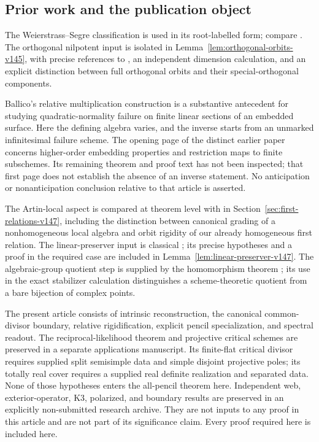 \documentclass[11pt,reqno]{amsart}
\numberwithin{equation}{section}
\theoremstyle{definition}\newtheorem{definition}[theorem]{Definition}
\theoremstyle{remark}\newtheorem{remark}[theorem]{Remark}
\begin{document}
\subsection{Prior work and the publication object}
The Weierstrass--Segre classification is used in its root-labelled
form; compare \cite[Theorem~1.1 and Corollary~2.1]{FevolaMandelshtamSturmfels}.
The orthogonal nilpotent input is isolated in
Lemma~\ref{lem:orthogonal-orbits-v145}, with precise references to
\cite[Proposition~1 and Theorem~1]{Ohta1986}, an independent dimension
calculation, and an explicit distinction between full orthogonal
orbits and their special-orthogonal components.

Ballico's relative multiplication construction
\cite[Theorem~0.2; \S1, Remark~1.2 and equation~(6)]{Ballico96}
is a substantive antecedent for studying quadratic-normality failure
on finite linear sections of an embedded surface.  Here the defining
algebra varies, and the inverse starts from an unmarked infinitesimal
failure scheme.  The opening page of the distinct earlier paper \cite[p.~5]{Ballico93}
concerns higher-order embedding properties and restriction maps to
finite subschemes.  Its remaining theorem and proof text has not
been inspected; that first page does not establish the absence of
an inverse statement.  No anticipation or nonanticipation conclusion
relative to that article is asserted.

The Artin-local aspect is compared at theorem level with
\cite{EliasRossiShort,EliasRossiCompressed} in
Section~\ref{sec:first-relations-v147}, including the distinction
between canonical grading of a nonhomogeneous local algebra and
orbit rigidity of our already homogeneous first relation.  The
linear-preserver input is classical \cite{MarcusMoyls}; its precise
hypotheses and a proof in the required case are included in
Lemma~\ref{lem:linear-preserver-v147}.  The algebraic-group
quotient step is supplied by the homomorphism theorem
\cite[Theorem~5.39 and Remark~5.42]{Milne2017}; its use in the
exact stabilizer calculation distinguishes a scheme-theoretic
quotient from a bare bijection of complex points.

The present article consists of intrinsic reconstruction, the canonical
common-divisor boundary, relative rigidification, explicit pencil
specialization, and spectral readout.  The reciprocal-likelihood theorem and projective critical
schemes are preserved in a separate applications manuscript.  Its
finite-flat critical divisor requires supplied split semisimple data
and simple disjoint projective poles; its totally real cover requires
a supplied real definite realization and separated data.  None of
those hypotheses enters the all-pencil theorem here.  Independent
web, exterior-operator, K3, polarized, and boundary results are
preserved in an explicitly non-submitted research archive.  They are
not inputs to any proof in this article and are not part of its
significance claim.  Every proof required here is included here.
\end{document}
